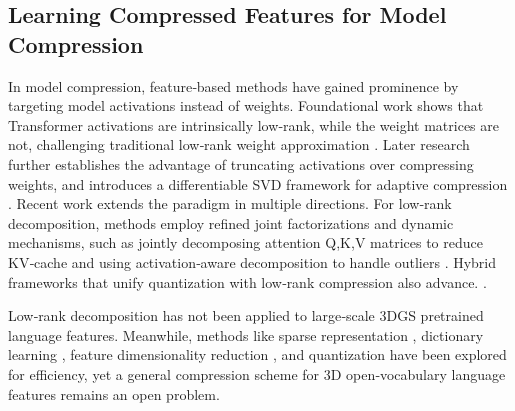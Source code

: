 \documentclass[runningheads]{llncs}
\begin{document}
\subsection{Learning Compressed Features for Model Compression}
In model compression, feature‑based methods have gained prominence by targeting model activations instead of weights. Foundational work shows that Transformer activations are intrinsically low‑rank, while the weight matrices are not, challenging traditional low‑rank weight approximation \cite{yu2023compressing}. Later research further establishes the advantage of truncating activations over compressing weights, and introduces a differentiable SVD framework for adaptive compression \cite{wang2025dobi}.
Recent work extends the paradigm in multiple directions. For low‑rank decomposition, methods employ refined joint factorizations and dynamic mechanisms, such as jointly decomposing attention Q,K,V matrices to reduce KV‑cache \cite{wang2025qsvd} and using activation‑aware decomposition to handle outliers \cite{tsitsikas2020nsvd}. Hybrid frameworks that unify quantization with low‑rank compression also advance. \cite{chiang2025uniql,mikaelyan2025deltallm}.

Low‑rank decomposition has not been applied to large‑scale 3DGS pretrained language features. Meanwhile, methods like sparse representation \cite{li2025langsplatv2}, dictionary learning \cite{wu2024opengaussian}, feature dimensionality reduction \cite{cheng2024occamslgssimpleapproach}, and quantization \cite{drsplat25} have been explored for efficiency, yet a general compression scheme for 3D open‑vocabulary language features remains an open problem.
\end{document}
